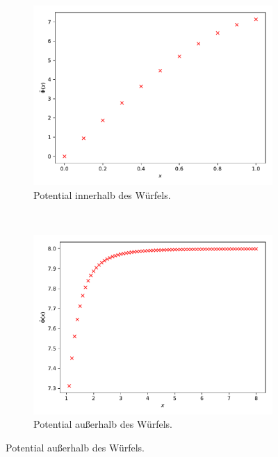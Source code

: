\begin{figure}
  \centering
  \begin{subfigure}[b]{0.45\textwidth}
      \includegraphics[width=\textwidth]{A2/build/innerhalb_b.pdf}
      \caption{Potential innerhalb des Würfels.}
      \label{fig:inn_b}
    \end{subfigure}
    ~ %
    \begin{subfigure}[b]{0.45\textwidth}
      \includegraphics[width=\textwidth]{A2/build/ausserhalb_b.pdf}
      \caption{Potential außerhalb des Würfels.}
      \label{fig:aus_b}
    \end{subfigure}

\end{figure}
